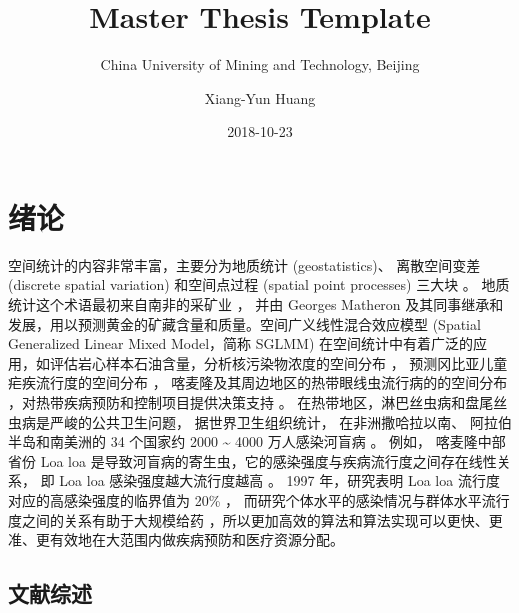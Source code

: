 \documentclass[12pt,a4paper,UTF8,twoside]{book}
\title{Master Thesis Template}
\subtitle{China University of Mining and Technology, Beijing}
\author{Xiang-Yun Huang}
\date{2018-10-23}
\theoremstyle{definition}
\theoremstyle{definition}
\theoremstyle{definition}
\theoremstyle{remark}
\begin{document}





{
\setcounter{tocdepth}{2}
\tableofcontents
}

\mainmatter

\hypertarget{intro}{%
\chapter{绪论}\label{intro}}

空间统计的内容非常丰富，主要分为地质统计 (geostatistics)、 离散空间变差
(discrete spatial variation) 和空间点过程 (spatial point processes)
三大块 \citep{Cressie1993}。 地质统计这个术语最初来自南非的采矿业
\citep{Krige1951}， 并由 Georges Matheron
及其同事继承和发展，用以预测黄金的矿藏含量和质量。空间广义线性混合效应模型
(Spatial Generalized Linear Mixed Model，简称 SGLMM)
在空间统计中有着广泛的应用，如评估岩心样本石油含量，分析核污染物浓度的空间分布
\citep{Diggle1998}， 预测冈比亚儿童疟疾流行度的空间分布
\citep{Diggle2002Childhood}，
喀麦隆及其周边地区的热带眼线虫流行病的的空间分布
\citep{Diggle2007ATMP}，对热带疾病预防和控制项目提供决策支持
\citep{Schl2016Using}。
在热带地区，淋巴丝虫病和盘尾丝虫病是严峻的公共卫生问题，
据世界卫生组织统计， 在非洲撒哈拉以南、 阿拉伯半岛和南美洲的 34 个国家约
2000 \textasciitilde{} 4000 万人感染河盲病 \citep{Takougang2002Rapid}。
例如， 喀麦隆中部省份 Loa loa
是导致河盲病的寄生虫，它的感染强度与疾病流行度之间存在线性关系， 即 Loa
loa 感染强度越大流行度越高 \citep{Boussinesq2001}。 1997 年，研究表明
Loa loa 流行度对应的高感染强度的临界值为 20\%
\citep{Gardon1997Serious}，
而研究个体水平的感染情况与群体水平流行度之间的关系有助于大规模给药
\citep{Schl2016Using}，所以更加高效的算法和算法实现可以更快、更准、更有效地在大范围内做疾病预防和医疗资源分配。

\hypertarget{reviews}{%
\section{文献综述}\label{reviews}}
\end{document}

